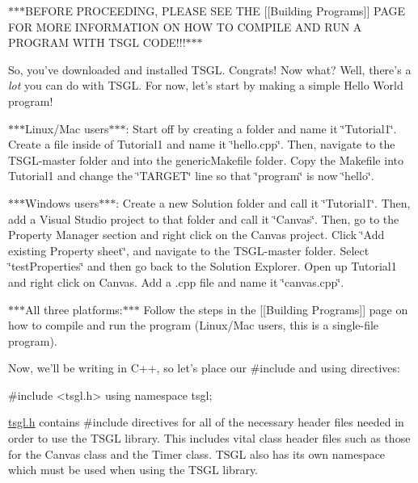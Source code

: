 $\ast$$\ast$$\ast$\-B\-E\-F\-O\-R\-E P\-R\-O\-C\-E\-E\-D\-I\-N\-G, P\-L\-E\-A\-S\-E S\-E\-E T\-H\-E \mbox{[}\mbox{[}Building Programs\mbox{]}\mbox{]} P\-A\-G\-E F\-O\-R M\-O\-R\-E I\-N\-F\-O\-R\-M\-A\-T\-I\-O\-N O\-N H\-O\-W T\-O C\-O\-M\-P\-I\-L\-E A\-N\-D R\-U\-N A P\-R\-O\-G\-R\-A\-M W\-I\-T\-H T\-S\-G\-L C\-O\-D\-E!!!$\ast$$\ast$$\ast$

So, you've downloaded and installed T\-S\-G\-L. Congrats! Now what? Well, there's a {\itshape lot} you can do with T\-S\-G\-L. For now, let's start by making a simple Hello World program!

$\ast$$\ast$$\ast$\-Linux/\-Mac users$\ast$$\ast$$\ast$\-: Start off by creating a folder and name it \char`\"{}\-Tutorial1\char`\"{}. Create a file inside of Tutorial1 and name it \char`\"{}hello.\-cpp\char`\"{}. Then, navigate to the T\-S\-G\-L-\/master folder and into the generic\-Makefile folder. Copy the Makefile into Tutorial1 and change the \char`\"{}\-T\-A\-R\-G\-E\-T\char`\"{} line so that \char`\"{}program\char`\"{} is now \char`\"{}hello\char`\"{}.

$\ast$$\ast$$\ast$\-Windows users$\ast$$\ast$$\ast$\-: Create a new Solution folder and call it \char`\"{}\-Tutorial1\char`\"{}. Then, add a Visual Studio project to that folder and call it \char`\"{}\-Canvas\char`\"{}. Then, go to the Property Manager section and right click on the Canvas project. Click \char`\"{}\-Add existing Property sheet\char`\"{}, and navigate to the T\-S\-G\-L-\/master folder. Select \char`\"{}test\-Properties\char`\"{} and then go back to the Solution Explorer. Open up Tutorial1 and right click on Canvas. Add a .cpp file and name it \char`\"{}canvas.\-cpp\char`\"{}.

$\ast$$\ast$$\ast$\-All three platforms\-:$\ast$$\ast$$\ast$ Follow the steps in the \mbox{[}\mbox{[}Building Programs\mbox{]}\mbox{]} page on how to compile and run the program (Linux/\-Mac users, this is a single-\/file program).

Now, we'll be writing in C++, so let's place our \#include and using directives\-:


\begin{DoxyCode}
\textcolor{preprocessor}{#include <tsgl.h>}
\textcolor{keyword}{using namespace }tsgl;
\end{DoxyCode}


{\ttfamily \hyperlink{tsgl_8h_source}{tsgl.\-h}} contains \#include directives for all of the necessary header files needed in order to use the T\-S\-G\-L library. This includes vital class header files such as those for the Canvas class and the Timer class. T\-S\-G\-L also has its own namespace which must be used when using the T\-S\-G\-L library.

